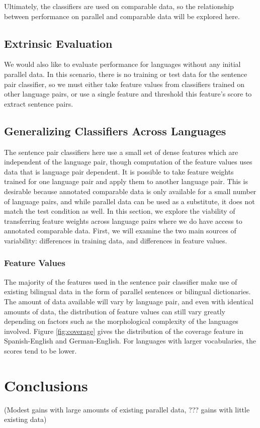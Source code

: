 Ultimately, the classifiers are used on comparable data, so the relationship
between performance on parallel and comparable data will be explored here.

\subsection{Extrinsic Evaluation}
We would also like to evaluate performance for languages without any initial
parallel data. In this scenario, there is no training or test data for the
sentence pair classifier, so we must either take feature values from classifiers
trained on other language pairs, or use a single feature and threshold this
feature's score to extract sentence pairs. %

\subsection{Generalizing Classifiers Across Languages}
The sentence pair classifiers here use a small set of dense features which are
independent of the language pair, though computation of the feature values uses
data that is language pair dependent. It is possible to take feature weights
trained for one language pair and apply them to another language pair. This is
desirable because annotated comparable data is only available for a small number
of language pairs, and while parallel data can be used as a substitute, it does
not match the test condition as well. In this section, we explore the viability
of transferring feature weights across language pairs where we do have access to
annotated comparable data. First, we will examine the two main sources of
variability: differences in training data, and differences in feature values.

\subsubsection{Feature Values}
The majority of the features used in the sentence pair classifier make use of
existing bilingual data in the form of parallel sentences or bilingual
dictionaries. The amount of data available will vary by language pair, and even
with identical amounts of data, the distribution of feature values can still
vary greatly depending on factors such as the morphological complexity of the
languages involved. Figure \ref{fig:coverage} gives the distribution of the
coverage feature in Spanish-English and German-English. For languages with
larger vocabularies, the scores tend to be lower.

\section{Conclusions}
(Modest gains with large amounts of existing parallel data, ??? gains with
little existing data)
